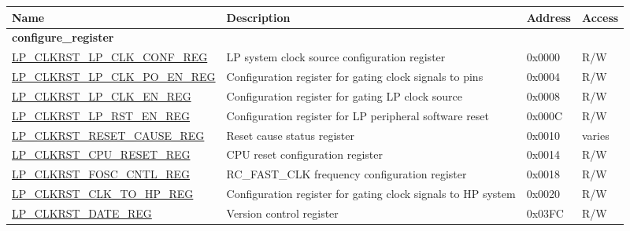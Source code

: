 \begin{longtable}{ | p{6cm} | p{7.2cm} | p{1.3cm} | p{1cm} | }
\hline\rowcolor{lightgray}
\textbf{Name} & \textbf{Description} &  \textbf{Address} & \textbf{Access} \\ \hline
\endhead
\multicolumn{4}{|l|}{\textbf{configure\_register}} \\ \hline
\hyperref[regdesc:LPCLKRSTLPCLKCONFREG]{LP\_CLKRST\_LP\_CLK\_CONF\_REG} & LP system clock source configuration register & 0x0000 & R/W \\ \hline
\hyperref[regdesc:LPCLKRSTLPCLKPOENREG]{LP\_CLKRST\_LP\_CLK\_PO\_EN\_REG} & Configuration register for gating clock signals to pins & 0x0004 & R/W \\ \hline
\hyperref[regdesc:LPCLKRSTLPCLKENREG]{LP\_CLKRST\_LP\_CLK\_EN\_REG} & Configuration register for gating LP clock source & 0x0008 & R/W \\ \hline
\hyperref[regdesc:LPCLKRSTLPRSTENREG]{LP\_CLKRST\_LP\_RST\_EN\_REG} & Configuration register for LP peripheral software reset & 0x000C & R/W \\ \hline
\hyperref[regdesc:LPCLKRSTRESETCAUSEREG]{LP\_CLKRST\_RESET\_CAUSE\_REG} & Reset cause status register & 0x0010 & varies \\ \hline
\hyperref[regdesc:LPCLKRSTCPURESETREG]{LP\_CLKRST\_CPU\_RESET\_REG} & CPU reset configuration register & 0x0014 & R/W \\ \hline
\hyperref[regdesc:LPCLKRSTFOSCCNTLREG]{LP\_CLKRST\_FOSC\_CNTL\_REG} & RC\_FAST\_CLK frequency configuration register & 0x0018 & R/W \\ \hline
\hyperref[regdesc:LPCLKRSTCLKTOHPREG]{LP\_CLKRST\_CLK\_TO\_HP\_REG} & Configuration register for gating clock signals to HP system & 0x0020 & R/W \\ \hline
\hyperref[regdesc:LPCLKRSTDATEREG]{LP\_CLKRST\_DATE\_REG} & Version control register & 0x03FC & R/W \\ \hline
\end{longtable}

